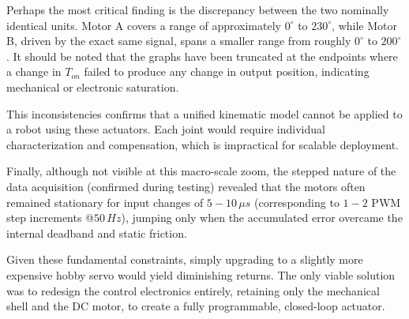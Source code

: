 Perhaps the most critical finding is the discrepancy between the two nominally identical units. Motor A covers
a range of approximately $0^{\circ}$ to $230^{\circ}$, while Motor B, driven by the exact same signal, spans a
smaller range from roughly $0^{\circ}$ to $200^{\circ}$. It should be noted that the graphs have been truncated
at the endpoints where a change in $T_{on}$ failed to produce any change in output position, indicating
mechanical or electronic saturation.

This inconsistencies confirms that a unified kinematic model cannot be applied to a robot using these actuators.
Each joint would require individual characterization and compensation, which is impractical for scalable
deployment.

Finally, although not visible at this macro-scale zoom, the stepped nature of the data acquisition
(confirmed during testing) revealed that the motors often remained stationary for input changes of
$5-10\,\mu s$ (corresponding to $1-2$ PWM step increments @$50\, Hz$), jumping only when the accumulated
error overcame the internal deadband and static friction.

Given these fundamental constraints, simply upgrading to a slightly more expensive hobby servo would yield
diminishing returns. The only viable solution was to redesign the control electronics entirely, retaining only
the mechanical shell and the DC motor, to create a fully programmable, closed-loop actuator.
